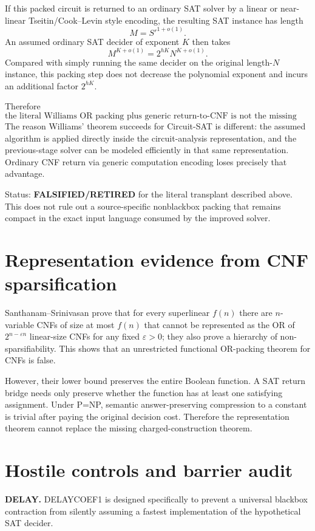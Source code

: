 \documentclass[11pt]{article}
\begin{document}
If this packed circuit is returned to an ordinary SAT solver by a linear or near-linear Tseitin/Cook--Levin style encoding, the resulting SAT instance has length
\[
M=S'^{1+o(1)}.
\]
An assumed ordinary SAT decider of exponent \(K\) then takes
\[
M^{K+o(1)}
=
2^{hK}N^{K+o(1)}.
\]
Compared with simply running the same decider on the original length-\(N\) instance, this packing step does not decrease the polynomial exponent and incurs an additional factor \(2^{hK}\).

Therefore
\[
\boxed{\text{the literal Williams OR packing plus generic return-to-CNF is not the missing polynomial-exponent contraction.}}
\]
The reason Williams' theorem succeeds for Circuit-SAT is different: the assumed algorithm is applied directly inside the circuit-analysis representation, and the previous-stage solver can be modeled efficiently in that same representation. Ordinary CNF return via generic computation encoding loses precisely that advantage.

Status: \textbf{FALSIFIED/RETIRED} for the literal transplant described above. This does not rule out a source-specific nonblackbox packing that remains compact in the exact input language consumed by the improved solver.

\section*{Representation evidence from CNF sparsification}
Santhanam--Srinivasan prove that for every superlinear \(f(n)\) there are \(n\)-variable CNFs of size at most \(f(n)\) that cannot be represented as the OR of \(2^{n-\varepsilon n}\) linear-size CNFs for any fixed \(\varepsilon>0\); they also prove a hierarchy of non-sparsifiability. This shows that an unrestricted functional OR-packing theorem for CNFs is false.

However, their lower bound preserves the entire Boolean function. A SAT return bridge needs only preserve whether the function has at least one satisfying assignment. Under P=NP, semantic answer-preserving compression to a constant is trivial after paying the original decision cost. Therefore the representation theorem cannot replace the missing charged-construction theorem.

\section*{Hostile controls and barrier audit}
\textbf{DELAY.} DELAYCOEF1 is designed specifically to prevent a universal blackbox contraction from silently assuming a fastest implementation of the hypothetical SAT decider.
\end{document}
